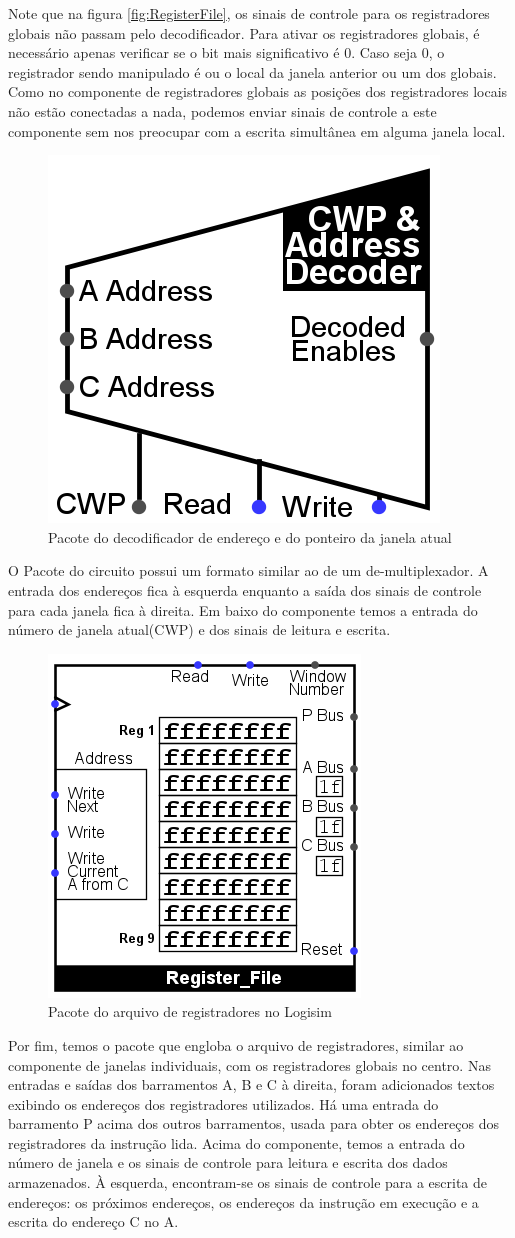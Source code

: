 \documentclass[
	article,			%
	11pt,				%
	oneside,			%
	a4paper,			%
	english,			%
	brazil,				%
	sumario=tradicional
	]{abntex2}
\begin{document}
Note que na figura \ref{fig:RegisterFile}, os sinais de controle para os registradores globais não passam pelo decodificador. Para ativar os registradores globais, é necessário apenas verificar se o bit mais significativo é 0. Caso seja 0, o registrador sendo manipulado é ou o local da janela anterior ou um dos globais. Como no componente de registradores globais as posições dos registradores locais não estão conectadas a nada, podemos enviar sinais de controle a este componente sem nos preocupar com a escrita simultânea em alguma janela local.
\begin{figure}[H]
    \centering
    \includegraphics[width=0.25\linewidth]{Logisim/cwpDecoderPack.png}
    \caption{Pacote do decodificador de endereço e do ponteiro da janela atual}
    \label{fig:cwpDecoderPack}
\end{figure}
O Pacote do circuito possui um formato similar ao de um de-multiplexador. A entrada dos endereços fica à esquerda enquanto a saída dos sinais de controle para cada janela fica à direita. Em baixo do componente temos a entrada do número de janela atual(CWP) e dos sinais de leitura e escrita.
\begin{figure}[H]
    \centering
    \includegraphics[width=0.25\linewidth]{Logisim/registerFilePack.png}
    \caption{Pacote do arquivo de registradores no Logisim}
    \label{fig:registerFilePack}
\end{figure}
Por fim, temos o pacote que engloba o arquivo de registradores, similar ao componente de janelas individuais, com os registradores globais no centro. Nas entradas e saídas dos barramentos A, B e C à direita, foram adicionados textos exibindo os endereços dos registradores utilizados. Há uma entrada do barramento P acima dos outros barramentos, usada para obter os endereços dos registradores da instrução lida. Acima do componente, temos a entrada do número de janela e os sinais de controle para leitura e escrita dos dados armazenados. À esquerda, encontram-se os sinais de controle para a escrita de endereços: os próximos endereços, os endereços da instrução em execução e a escrita do endereço C no A.
\end{document}

